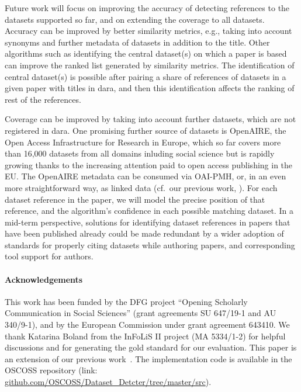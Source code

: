 \documentclass{IOS-Book-Article}
\newcommand{\dara}{\textsf{da\textbar ra}}
\begin{document}
Future work will focus on improving the accuracy of detecting references to the datasets supported so far, and on extending the coverage to all datasets.
Accuracy can be improved by better similarity metrics, e.g., taking into account synonyms and further metadata of datasets in addition to the title.
Other algorithms such as identifying the central dataset(s) on which a paper is based can improve the ranked list generated by similarity metrics.
The identification of central dataset(s) is possible after pairing a share of references of datasets in a given paper with titles in {\dara}, and then this identification affects the ranking of rest of the references. 

Coverage can be improved by 
taking into account further datasets, which are not registered in {\dara}.
One promising further source of datasets is OpenAIRE, the Open Access Infrastructure for Research in Europe, which so far covers more than 16,000 datasets from all domains inluding social science but is rapidly growing thanks to the increasing attention paid to open access publishing in the EU.
The OpenAIRE metadata can be consumed via OAI-PMH, or, in an even more straightforward way, as linked data (cf.\ our previous work, \citet{VahdatiEtAl:MappingResearchMetadata15}).
For each dataset reference in the paper, we will model the precise position of that reference, and the algorithm's confidence in each possible matching dataset.
In a mid-term perspective, solutions for identifying dataset references in papers that have been published already could be made redundant by a wider adoption of 
standards for properly citing datasets while authoring papers, and corresponding tool support for authors.

\paragraph{Acknowledgements}
This work has been funded by the DFG project “Opening Scholarly Communication in Social Sciences” 
(grant agreements SU 647/19-1 and AU 340/9-1), and by the European Commission under grant agreement 643410. 
We thank Katarina Boland from the InFoLiS II project (MA 5334/1-2) for helpful discussions and for generating the gold standard for our evaluation. 
This paper is an extension of our previous work~\cite{ghavimi2016identifying}. The implementation code is available in the OSCOSS repository (link: \url{github.com/OSCOSS/Dataset_Detcter/tree/master/src}). 


\end{document}
